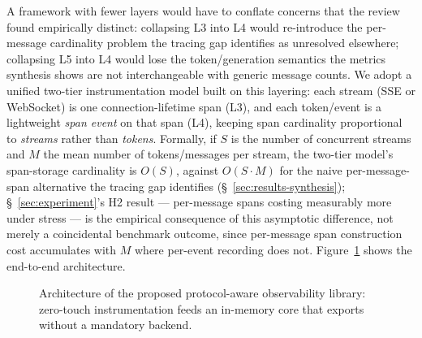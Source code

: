 \documentclass[11pt]{article}
\begin{document}
A framework with fewer layers would have to conflate concerns that the review found empirically distinct: collapsing L3 into L4 would re-introduce the per-message cardinality problem the tracing gap identifies as unresolved elsewhere; collapsing L5 into L4 would lose the token/generation semantics the metrics synthesis shows are not interchangeable with generic message counts. We adopt a unified two-tier instrumentation model built on this layering: each stream (SSE or WebSocket) is one connection-lifetime span (L3), and each token/event is a lightweight \emph{span event} on that span (L4), keeping span cardinality proportional to \emph{streams} rather than \emph{tokens}. Formally, if $S$ is the number of concurrent streams and $M$ the mean number of tokens/messages per stream, the two-tier model's span-storage cardinality is $O(S)$, against $O(S\cdot M)$ for the naive per-message-span alternative the tracing gap identifies (\S~\ref{sec:results-synthesis}); \S~\ref{sec:experiment}'s H2 result --- per-message spans costing measurably more under stress --- is the empirical consequence of this asymptotic difference, not merely a coincidental benchmark outcome, since per-message span construction cost accumulates with $M$ where per-event recording does not. Figure~\ref{fig:arch} shows the end-to-end architecture.

\begin{figure}[H]
\centering
{}
\caption{Architecture of the proposed protocol-aware observability library: zero-touch instrumentation feeds an in-memory core that exports without a mandatory backend.}
\label{fig:arch}
\end{figure}
\end{document}
